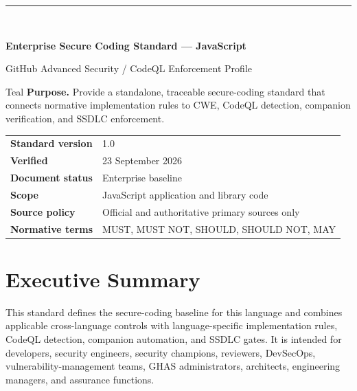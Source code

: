 \documentclass[10pt,letterpaper]{article}
\begin{document}
\fancyhead[L]{\textcolor{Muted}{Enterprise Secure Coding Standard --- JavaScript}}
\fancyhead[R]{\textcolor{Muted}{v1.0 --- 23 September 2026}}
\hypersetup{pageanchor=false}
\begin{titlepage}
\thispagestyle{empty}
\vspace*{0.85in}
{\color{Teal}\rule{1.2in}{3pt}}\\[0.32in]
{\Huge\bfseries\color{Navy}Enterprise Secure Coding Standard --- JavaScript\par}
\vspace{0.18in}
{\Large\color{Teal}GitHub Advanced Security / CodeQL Enforcement Profile\par}
\vspace{0.55in}
\begin{callout}{Teal}
\textbf{Purpose.} Provide a standalone, traceable secure-coding standard that connects normative implementation rules to CWE, CodeQL detection, companion verification, and SSDLC enforcement.
\end{callout}
\vfill
\begin{tabular}{@{}ll@{}}
\textbf{Standard version} & 1.0 \\
\textbf{Verified} & 23 September 2026 \\
\textbf{Document status} & Enterprise baseline \\
\textbf{Scope} & JavaScript application and library code \\
\textbf{Source policy} & Official and authoritative primary sources only \\
\textbf{Normative terms} & MUST, MUST NOT, SHOULD, SHOULD NOT, MAY \\
\end{tabular}
\vspace{0.55in}
\end{titlepage}
\hypersetup{pageanchor=true}
\tableofcontents
\clearpage
{}

\section{Executive Summary}
This standard defines the secure-coding baseline for this language and combines applicable cross-language controls with language-specific implementation rules, CodeQL detection, companion automation, and SSDLC gates. It is intended for developers, security engineers, security champions, reviewers, DevSecOps, vulnerability-management teams, GHAS administrators, architects, engineering managers, and assurance functions.
\end{document}
